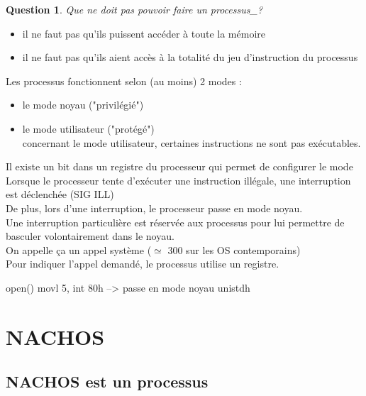\documentclass[12pt,a4paper]{report}
\newtheorem*{q}{Question}
\begin{document}
\medskip
\begin{q}Que ne doit pas pouvoir faire un processus_?\end{q}
\begin{itemize}
\item il ne faut pas qu'ils puissent accéder à toute la mémoire
\item il ne faut pas qu'ils aient accès à la totalité du jeu d'instruction du processus\\
\end{itemize}

\bigskip

Les processus fonctionnent selon (au moins) 2 modes :
\begin{itemize}
\item le mode noyau ("privilégié")
\item le mode utilisateur ("protégé")\\
concernant le mode utilisateur, certaines instructions ne sont pas exécutables.
\end{itemize}
Il existe un bit dans un registre du processeur qui permet de configurer le mode\\

Lorsque le processeur tente d'exécuter une instruction illégale, une interruption est déclenchée (SIG ILL)\\
De plus, lors d'une interruption, le processeur passe en mode noyau.\\
Une interruption particulière est réservée aux processus pour lui permettre de basculer volontairement dans le noyau.\\
On appelle ça un appel système ($\simeq$ 300 sur les OS contemporains)\\

Pour indiquer l'appel demandé, le processus utilise un registre.
\medskip
\begin{verbatimtab}
open()
{
 movl 5, %
 int 80h      --> passe en mode noyau
}
unistdh
\end{verbatimtab}



\chapter{NACHOS}
\section{NACHOS est un processus}
\end{document}
